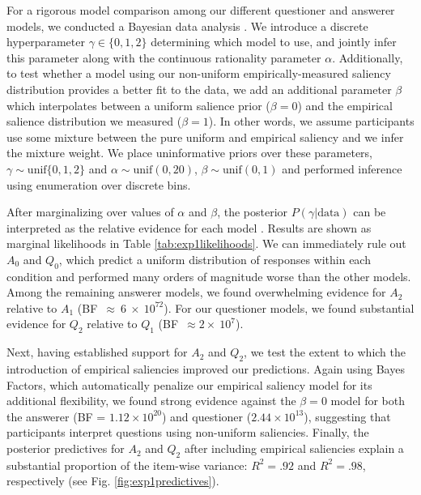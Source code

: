 \documentclass[12pt, floatsintext, jou]{apa6}
\newcommand{\ndg}[1]{\textcolor{Green}{[ndg: #1]}}
\begin{document}
For a rigorous model comparison among our different questioner and answerer models, we conducted a Bayesian data analysis \cite{LeeWagenmakers14_BDA}. 
We introduce a discrete hyperparameter $\gamma \in \{0, 1, 2\}$  determining which model to use, and jointly infer this parameter along with the continuous rationality parameter $\alpha$.
Additionally, to test whether a model using our non-uniform empirically-measured saliency distribution provides a better fit to the data, we add an additional parameter $\beta$ which interpolates between a uniform salience prior ($\beta = 0$) and the empirical salience distribution we measured ($\beta = 1$). 
In other words, we assume participants use some mixture between the pure uniform and empirical saliency and we infer the mixture weight.
We place uninformative priors over these parameters,
$\gamma \sim  \textrm{unif}\{0, 1, 2\}$ and 
$\alpha   \sim  \textrm{unif}(0,20)$, 
$\beta \sim \textrm{unif}(0, 1)$
and performed inference using enumeration over discrete bins. 

After marginalizing over values of $\alpha$ and $\beta$, the posterior $P(\gamma | \textrm{data})$ can be interpreted as the relative evidence for each model \cite{KruschkeVanPaemel15_OxfordHandbook}.
Results are shown as marginal likelihoods in Table \ref{tab:exp1likelihoods}. 
We can immediately rule out $A_0$ and $Q_0$, which predict a uniform distribution of responses within each condition and performed many orders of magnitude worse than the other models.
Among the remaining answerer models, we found overwhelming evidence for $A_2$ relative to $A_1$ (BF~$\approx~6~\times~10^{72}$). 
For our questioner models, we found substantial evidence for $Q_2$ relative to $Q_1$ (BF~$\approx2\times~10^{7}$). 

Next, having established support for $A_2$ and $Q_2$, we test the extent to which the introduction of empirical saliencies improved our predictions. 
Again using Bayes Factors, which automatically penalize our empirical saliency model for its additional flexibility, we found strong evidence against the $\beta=0$ model for both the answerer (BF = $1.12\times 10^{20}$) and questioner ($2.44 \times 10^{13}$), suggesting that participants interpret questions using non-uniform saliencies.
Finally, the posterior predictives for $A_2$ and $Q_2$ after including empirical saliencies explain a substantial proportion of the item-wise variance: $R^2 = .92$ and $R^2 = .98$, respectively (see Fig. \ref{fig:exp1predictives}). %
\end{document}
